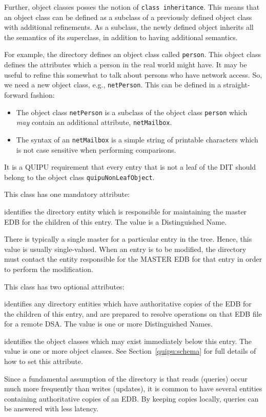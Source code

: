 Further, object classes posses the notion of 
\verb"class inheritance".
This means that an object class can be defined as a subclass of
a previously defined object class with additional refinements.
As a subclass,
the newly defined object inherits all the semantics of its
superclass,
in addition to having additional semantics.

For example,
the directory defines an object class called \verb"person".
This object class defines the attributes which a person in
the real world might have.
It may be useful to refine this somewhat to talk about persons
who have network access.
So, we need a new object class, e.g., \verb"netPerson".
This can be defined in a straight-forward fashion:
\begin{itemize}
\item The object class \verb"netPerson" is a subclass of the object class
\verb"person" which {\em may\/} contain an additional attribute,
\verb"netMailbox".

\item The syntax of an \verb"netMailbox" is a simple string of printable
characters which is not case sensitive when performing comparisons.
\end{itemize}

It is a QUIPU requirement that every entry that is not a leaf of the DIT 
should belong to the object class
\verb"quipuNonLeafObject". 

This class has one mandatory attribute:
\begin{describe}
\item[\verb+masterDSA+:]
			identifies the directory entity which is responsible
			for maintaining the master EDB for the children of
			this entry.
			The value is a Distinguished Name.
\end{describe}
There is typically a single master for a particular entry in the tree.
Hence, this value is usually single-valued.
When an entry is to be modified,
the directory must contact the entity responsible for the MASTER EDB for
that entry in order to perform the modification.

This class has two optional attributes:
\begin{describe}
\item[\verb+slaveDSA+:]
			identifies any directory entities which have
			authoritative copies of the EDB for the children
			of this entry, and are prepared to resolve 
			operations on that EDB file for a remote DSA.
			The value is one or more Distinguished Names.

\item[\verb+treeStructure+:]
			identifies the object classes which may exist
			immediately below this entry.
			The value is one or more object classes.
			See Section~\ref{quipu:schema} for full details
			of how to set this attribute.
\end{describe}
Since a fundamental assumption of the directory is that reads (queries)
occur much more frequently than writes (updates),
it is common to have several entities containing authoritative copies of an
EDB.
By keeping copies locally,
queries can be answered with less latency.

